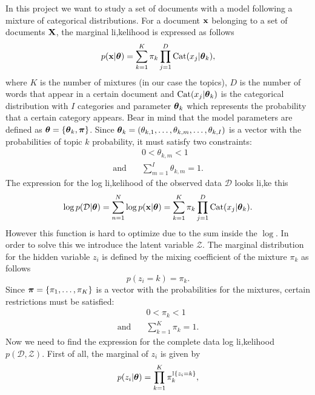 \documentclass[12pt]{article}
\begin{document}
\noindent In this project we want to study a set of documents with a model following a mixture of categorical distributions. For a document $\mathbf{x}$ belonging to a set of documents $\mathbf{X}$, the marginal li,kelihood is expressed as follows
\begin{equation}\label{eq:marginal_x_given_z}
     p(\mathbf{x}|\boldsymbol\theta) = \sum_{k=1}^{K}\pi_k\prod_{j=1}^{D}\operatorname{\mathrm{Cat}}(x_j|\boldsymbol\theta_k),
\end{equation}
where $K$ is the number of mixtures (in our case the topics), $D$ is the number of words that appear in a certain document and $\operatorname{\mathrm{Cat}}(x_j|\boldsymbol\theta_k)$ is the categorical distribution with $I$ categories and parameter $\boldsymbol\theta_k$ which represents the probability that a certain category appears. Bear in mind that the model parameters are defined as $\boldsymbol\theta = \{\boldsymbol\theta_k, \boldsymbol\pi\}$. Since $\boldsymbol\theta_k = (\theta_{k,1},\dots, \theta_{k,m}, \dots, \theta_{k,I})$ is a vector with the probabilities of topic $k$ probability, it must satisfy two constraints:
\begin{align}\label{eq:theta_constraint}
& 0 < \theta_{k,m} < 1\\
\text{and} \quad & \sum\limits_{m=1}^{I}\theta_{k,m} = 1.
\end{align}
\noindent The expression for the log li,kelihood of the observed data $\mathcal{D}$ looks li,ke this
\begin{equation}
\log p (\mathcal{D}|\boldsymbol\theta) = \sum\limits_{n=1}^{N}\log p(\mathbf{x}|\boldsymbol\theta) = \sum_{k=1}^{K}\pi_k\prod_{j=1}^{D}\operatorname{\mathrm{Cat}}(x_j|\boldsymbol\theta_k).
\end{equation}
However this function is hard to optimize due to the sum inside the $\log$. In order to solve this we introduce the latent variable $\mathcal{Z}$. The marginal distribution for the hidden variable $z_i$ is defined by the mixing coefficient of the mixture $\pi_k$ as follows
\begin{equation}
p(z_i=k) = \pi_k.
\end{equation}
Since $\boldsymbol\pi = \{\pi_1,\dots,\pi_K\}$ is a vector with the probabilities for the mixtures, certain restrictions must be satisfied:
\begin{align}\label{eq:pi_constraint}
& 0 < \pi_k < 1 \\
\text{and} \quad  & \sum\limits_{k=1}^{K} \pi_k = 1.
\end{align}
Now we need to find the expression for the complete data log li,kelihood $p(\mathcal{D},\mathcal{Z})$. First of all, the marginal of $z_i$ is given by
\begin{equation}\label{eq:marginal_z}
p(z_i|\boldsymbol\theta) = \prod_{k=1}^{K}\pi_k^{\mathbb{I} \lbrace z_i=k \rbrace},
\end{equation}
\end{document}
